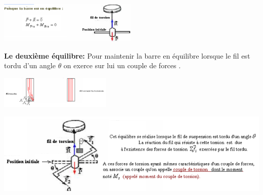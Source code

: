 \documentclass[12pt]{article}
\begin{document}
\begin{center}
\includegraphics[width=0.5\textwidth]{./img/torsion_01.png}
\end{center}


\textbf{ Le deuxième équilibre:} Pour maintenir la barre en équilibre lorsque le fil est tordu d'un angle $\theta$ on exerce sur lui un couple de forces .
\begin{center}
\includegraphics[width=0.4\textwidth]{./img/torion_00.png}
\end{center}
\begin{center}
\includegraphics[width=1\textwidth]{./img/torsion_03.png}
\end{center}
\end{document}
